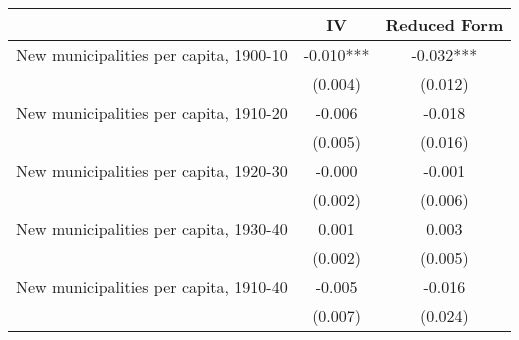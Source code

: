  \begin{tabular}{l*{2}{c}} \toprule
                &\multicolumn{1}{c}{IV}&\multicolumn{1}{c}{Reduced Form}\\
\midrule
New municipalities per capita, 1900-10&   -0.010***&   -0.032***\\
                &  (0.004)   &  (0.012)   \\
\addlinespace
New municipalities per capita, 1910-20&   -0.006   &   -0.018   \\
                &  (0.005)   &  (0.016)   \\
\addlinespace
New municipalities per capita, 1920-30&   -0.000   &   -0.001   \\
                &  (0.002)   &  (0.006)   \\
\addlinespace
New municipalities per capita, 1930-40&    0.001   &    0.003   \\
                &  (0.002)   &  (0.005)   \\
\addlinespace
New municipalities per capita, 1910-40&   -0.005   &   -0.016   \\
                &  (0.007)   &  (0.024)   \\
 \bottomrule \end{tabular}
